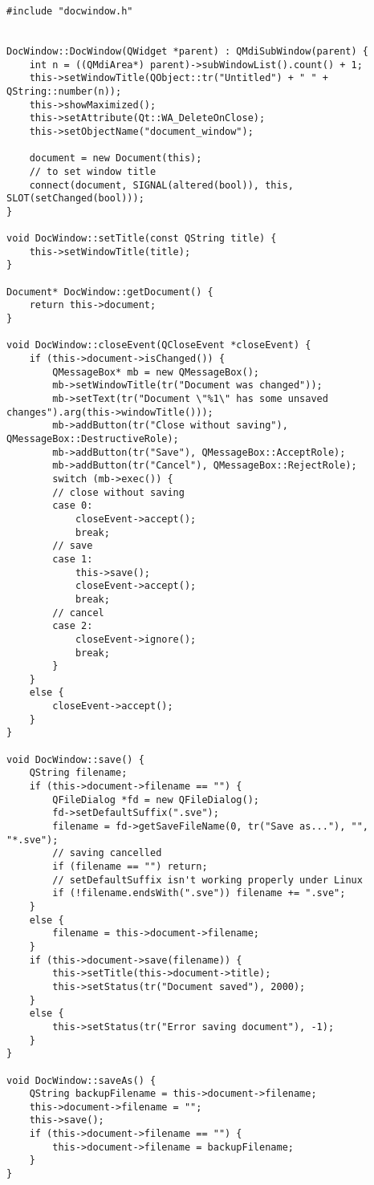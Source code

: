 \begin{lstlisting}
#include "docwindow.h"


DocWindow::DocWindow(QWidget *parent) : QMdiSubWindow(parent) {
    int n = ((QMdiArea*) parent)->subWindowList().count() + 1;
    this->setWindowTitle(QObject::tr("Untitled") + " " + QString::number(n));
    this->showMaximized();
    this->setAttribute(Qt::WA_DeleteOnClose);
    this->setObjectName("document_window");

    document = new Document(this);
    // to set window title
    connect(document, SIGNAL(altered(bool)), this, SLOT(setChanged(bool)));
}

void DocWindow::setTitle(const QString title) {
    this->setWindowTitle(title);
}

Document* DocWindow::getDocument() {
    return this->document;
}

void DocWindow::closeEvent(QCloseEvent *closeEvent) {
    if (this->document->isChanged()) {
        QMessageBox* mb = new QMessageBox();
        mb->setWindowTitle(tr("Document was changed"));
        mb->setText(tr("Document \"%1\" has some unsaved changes").arg(this->windowTitle()));
        mb->addButton(tr("Close without saving"), QMessageBox::DestructiveRole);
        mb->addButton(tr("Save"), QMessageBox::AcceptRole);
        mb->addButton(tr("Cancel"), QMessageBox::RejectRole);
        switch (mb->exec()) {
        // close without saving
        case 0:
            closeEvent->accept();
            break;
        // save
        case 1:
            this->save();
            closeEvent->accept();
            break;
        // cancel
        case 2:
            closeEvent->ignore();
            break;
        }
    }
    else {
        closeEvent->accept();
    }
}

void DocWindow::save() {
    QString filename;
    if (this->document->filename == "") {
        QFileDialog *fd = new QFileDialog();
        fd->setDefaultSuffix(".sve");
        filename = fd->getSaveFileName(0, tr("Save as..."), "", "*.sve");
        // saving cancelled
        if (filename == "") return;
        // setDefaultSuffix isn't working properly under Linux
        if (!filename.endsWith(".sve")) filename += ".sve";
    }
    else {
        filename = this->document->filename;
    }
    if (this->document->save(filename)) {
        this->setTitle(this->document->title);
        this->setStatus(tr("Document saved"), 2000);
    }
    else {
        this->setStatus(tr("Error saving document"), -1);
    }
}

void DocWindow::saveAs() {
    QString backupFilename = this->document->filename;
    this->document->filename = "";
    this->save();
    if (this->document->filename == "") {
        this->document->filename = backupFilename;
    }
}


\end{lstlisting}
